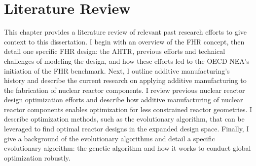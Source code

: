 \chapter{Literature Review}
\label{chap:lit-review}

This chapter provides a literature review of relevant past research efforts 
to give context to this dissertation. 
I begin with an overview of the \gls{FHR} concept, then detail one specific 
\gls{FHR} design: the \gls{AHTR}, previous efforts and technical 
challenges of modeling the design, and how these efforts led to the \gls{OECD} 
\gls{NEA}'s initiation of the \gls{FHR} benchmark.
Next, I outline additive manufacturing's history and describe the current 
research on applying additive manufacturing to the fabrication of nuclear 
reactor components. 
I review previous nuclear reactor design optimization efforts and describe how 
additive manufacturing of nuclear reactor components enables optimization for 
less constrained reactor geometries. 
I describe optimization methods, such as the evolutionary algorithm, that can 
be leveraged to find optimal reactor designs in the expanded design space.
Finally, I give a background of the evolutionary algorithms and detail a specific 
evolutionary algorithm: the genetic algorithm and how it works to conduct global 
optimization robustly.

